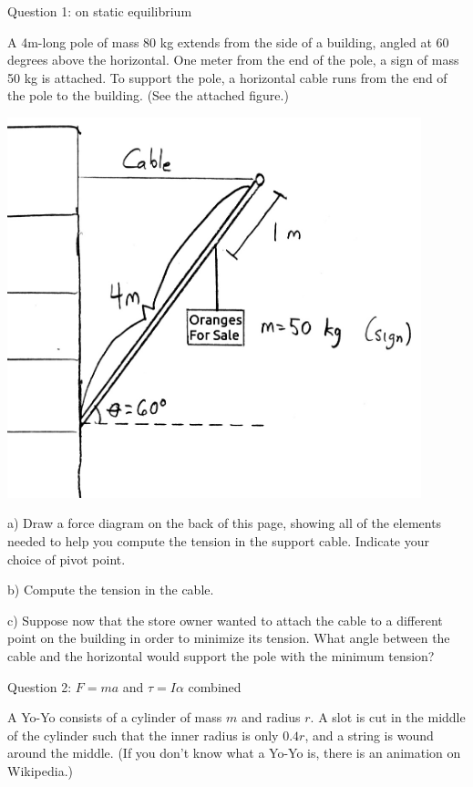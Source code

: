 \documentclass[12pt]{article}
\begin{document}
\centerline{\large Question 1: on static equilibrium}
\begin{minipage}[b]{0.4\textwidth}
  \vspace{-0.8in}

A 4m-long pole of mass 80 kg extends from the side of a building, angled at 60 degrees above the horizontal. One meter from the end of the pole, a sign of mass 50 kg is attached. To support the pole,
a horizontal cable runs from the end of the pole to the building. (See the attached figure.)

\bigskip
\bigskip
\bigskip
\bigskip
\bigskip
\bigskip

\end{minipage}
\begin{minipage}[t]{0.6\textwidth}
  \begin{flushright}
  \includegraphics[width=0.9\textwidth]{sign2.jpg}
\end{flushright}
\end{minipage}

\bigskip
\bigskip


a) Draw a force diagram on the back of this page, showing all of the elements needed to help you compute the tension in the support cable. Indicate
your choice of pivot point.

\bigskip

b) Compute the tension in the cable. 

\vspace{2 in}

c) Suppose now that the store owner wanted to attach the cable to a different point on the building in order to minimize its tension. What angle between the
cable and the horizontal would support the pole with the minimum tension?
\newpage
\newpage
\rm
\centerline{\large Question 2: $F=ma$ and $\tau = I \alpha$ combined}
A Yo-Yo consists of a cylinder of mass $m$ and radius $r$. A slot is cut in the middle of the cylinder such that the inner radius is only $0.4r$, and a string is wound around the middle. (If you don't know what a Yo-Yo is, there is an animation on Wikipedia.)
\end{document}
